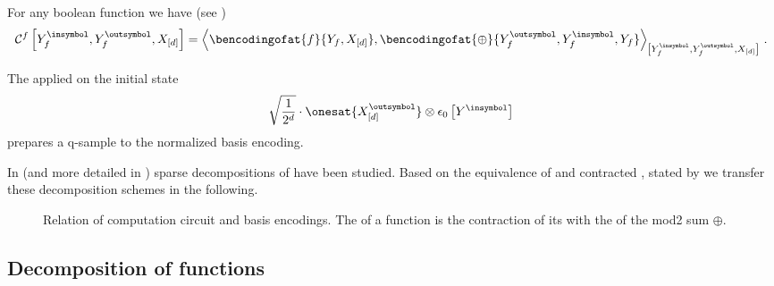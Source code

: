 \begin{lemma}
    \label{lem:bencComCircuit}
    For any boolean function we have (see )
    \begin{align*}
        \qcbencodingofat{\exformula}{\cheadvariableof{\exformula}{\insymbol},\cheadvariableof{\exformula}{\outsymbol},\shortcatvariables}
        = \contractionof{
            \bencodingofat{\exformula}{\headvariableof{\exformula},\shortcatvariables},
            \bencodingofat{\oplus}{\cheadvariableof{\exformula}{\outsymbol},\cheadvariableof{\exformula}{\insymbol},\headvariableof{\exformula}}
        }{\cheadvariableof{\exformula}{\insymbol},\cheadvariableof{\exformula}{\outsymbol},\shortcatvariables} \, .
    \end{align*}
\end{lemma}


The \computationCircuit{} applied on the initial state
\begin{align*}
    \sqrt{\frac{1}{2^{\catorder}}} \cdot \onesat{\ccatvariableof{[\atomorder]}{\outsymbol}} \otimes \fbasisat{\cheadvariable{\insymbol}}
\end{align*}
prepares a q-sample to the normalized basis encoding. %


In \cite{goessmann_tensor_2026} (and more detailed in \cite{goessmann_tensor-network_2025}) sparse decompositions of \basisEncodings{} have been studied.
Based on the equivalence of \computationCircuits{} and contracted \basisEncodings{}, stated by  we transfer these decomposition schemes in the following.

\begin{figure}[t]
    \begin{center}
        
    \end{center}
    \caption{Relation of computation circuit and basis encodings.
    The \computationCircuit{} of a function is the contraction of its \basisEncoding{} with the \basisEncoding{} of the mod2 sum $\oplus$.}
    \label{fig:bencComCircuit}
\end{figure}



\subsection{Decomposition of functions}

